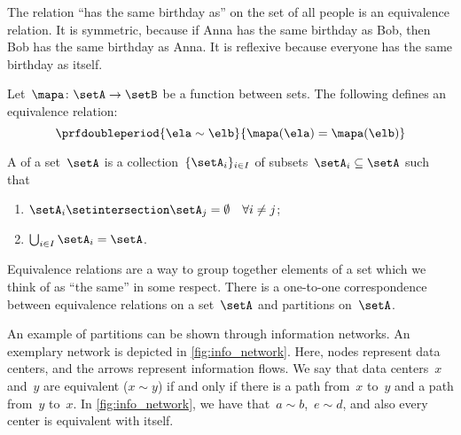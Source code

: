 \begin{example}
    The relation ``has the same birthday as'' on the set of all people is an equivalence relation.
    It is symmetric, because if Anna has the same birthday as Bob, then Bob has the same birthday as Anna.
    It is reflexive because everyone has the same birthday as itself.
\end{example}

\begin{example}
    Let~$\mapa\colon \setA\to \setB$ be a function between sets.
    The following defines an equivalence relation:
    \begin{equation*}
        \prfdoubleperiod{
            \ela\sim \elb
        }{
            \mapa(\ela)=\mapa(\elb)
        }
    \end{equation*}
\end{example}

\begin{ctdefinition}[Partition]
    \label{def:partition}
    A \emph{} of a set~$\setA$ is a collection~$\{\setA_i\}_{i\in I}$ of subsets~$\setA_i\subseteq \setA$ such that
    \begin{enumerate}
        \item $\setA_i\setintersection \setA_j=\emptyset \quad \forall i\neq j$;
        \item $\bigcup_{i\in I}\setA_i=\setA$.
    \end{enumerate}
\end{ctdefinition}

\begin{remark}
    Equivalence relations are a way to group together elements of a set which we think of as ``the same'' in some respect.
    There is a one-to-one correspondence between equivalence relations on a set~$\setA$ and partitions on~$\setA$.
\end{remark}

\begin{marginfigure}
    \centering
    \caption{
        \label{fig:info_network}
    }
\end{marginfigure}

\begin{example}
    An example of partitions can be shown through information networks.
    An exemplary network is depicted in \cref{fig:info_network}.
    Here, nodes represent data centers, and the arrows represent information flows.
    We say that data centers~$x$ and~$y$ are equivalent ($x\sim y$) if and only if there is a path from~$x$ to~$y$ and a path from~$y$ to~$x$.
    In \cref{fig:info_network}, we have that~$a\sim b$,~$e\sim d$, and also every center is equivalent with itself.
\end{example}

